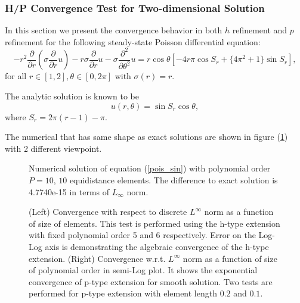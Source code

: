 
\subsubsection {H/P Convergence Test for Two-dimensional Solution}

In this section we present the convergence behavior in both $h$
refinement and $p$ refinement for the following steady-state
Poisson differential equation:
\begin{equation}
\label{pois_sin}
-r^2 \frac{\partial}{\partial r} (\sigma \frac{\partial}{\partial r}u) - r \sigma \frac{\partial}{\partial r}u - \sigma \frac{\partial^2}{\partial \theta^2}u = r \cos \theta \left[ -4 r \pi \cos S_r + \{4\pi^2 + 1\} \sin S_r \right],
\end{equation}
for all $r \in [1, 2], \theta \in [0, 2\pi]$ with $\sigma(r) = r$.

The analytic solution is known to be
\begin{equation}
u(r, \theta) = \sin S_r \cos \theta,
\end{equation}
where $S_r = 2\pi (r-1) - \pi$.

The numerical that has same shape as exact solutions are shown in
figure (\ref{sinsol}) with 2 different viewpoint.

\begin{figure}[h]
    \begin{center}
    \caption{\label{sinsol}Numerical solution of equation (\ref{pois_sin}) with polynomial order $P=10$, $10$ equidistance elements. The difference to exact solution is 4.7740e-15 in terms of $L_{\infty}$ norm.}
    \end{center}
\end{figure}

\begin{figure}[h]
    \begin{center}
    \caption{\label{sinDNconv}
(Left) Convergence with respect to discrete $L^{\infty}$ norm as a
function of size of elements. This test is performed using the
h-type extension with fixed polynomial order 5 and 6 respectively.
Error on the Log-Log axis is demonstrating the algebraic
convergence of the h-type extension. (Right) Convergence w.r.t.
$L^{\infty}$ norm as a function of size of polynomial order in
semi-Log plot. It shows the exponential convergence of p-type
extension for smooth solution. Two tests are performed for p-type
extension with element length $0.2$ and $0.1$. }
\end{center}
\end{figure}


